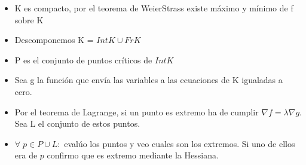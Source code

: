 \documentclass[twoside]{article}
\newcommand{\all}{\forall \;}
\begin{document}
\begin{itemize}
\item K es compacto, por el teorema de WeierStrass existe máximo y mínimo de f sobre K

\item Descomponemos K = $Int K \cup Fr K$

\item P es el conjunto de puntos críticos de $IntK$

\item Sea g la función que envía las variables a las ecuaciones de K igualadas a cero.

\item Por el teorema de Lagrange, si un punto es extremo ha de cumplir $\nabla f = \lambda \nabla g$. Sea L el conjunto de estos puntos.

\item $\all p \in P \cup L:$ evalúo los puntos y veo cuales son los extremos. Si uno de ellos era de $p$ confirmo que es extremo mediante la Hessiana.


\end{itemize}
\end{document}

